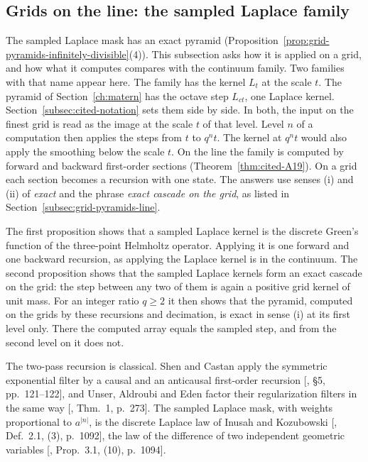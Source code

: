 \subsection{Grids on the line: the sampled Laplace family}
\label{subsec:sampled-laplace}

The sampled Laplace mask has an exact pyramid
(Proposition~\ref{prop:grid-pyramids-infinitely-divisible}(4)). This subsection asks how it is
applied on a grid, and how what it computes compares with the continuum \Matern{} family. Two
families with that name appear here. The \Matern{} family has the kernel $L_t$ at the scale $t$.
The \Matern{} pyramid of Section~\ref{ch:matern} has the octave step $L_{ct}$, one Laplace kernel.
Section~\ref{subsec:cited-notation} sets them side by side. In both, the input on the finest grid is
read as the image at the scale $t$ of that level. Level $n$ of a computation then applies the steps
from $t$ to $q^nt$. The kernel at $q^nt$ would also apply the smoothing below the scale $t$. On the line the
\Matern{} family is computed by forward and backward first-order sections
 (Theorem~\ref{thm:cited-A19}). On a grid each section becomes
a recursion with one state. The answers use senses (i) and (ii) of
\emph{exact} and the phrase \emph{exact cascade on the grid}, as listed in
Section~\ref{subsec:grid-pyramids-line}.

The first proposition shows that a sampled Laplace kernel is the discrete Green's function of the
three-point Helmholtz operator. Applying it is one forward and one backward recursion, as applying
the Laplace kernel is in the continuum. The second proposition shows that the sampled Laplace
kernels form an
exact cascade on the grid: the step between any two of them is again a positive grid kernel of unit
mass. For an integer ratio $q \ge 2$ it then shows that the \Matern{} pyramid, computed on the
grids by these recursions and decimation, is exact in sense (i) at its first level only. There the
computed array equals the sampled step, and from the second level on it does not.

The two-pass recursion is classical. Shen and Castan apply the symmetric exponential filter by a
causal and an anticausal first-order recursion [, \S 5, pp.~121--122], and
Unser, Aldroubi and Eden factor their regularization filters in the same way
[, Thm.~1, p.~273]. The sampled Laplace mask, with weights proportional
to $a^{|n|}$, is the discrete Laplace law of Inusah and Kozubowski
[, Def.~2.1, (3), p.~1092], the law of the difference of two independent
geometric variables [, Prop.~3.1, (10), p.~1094].

